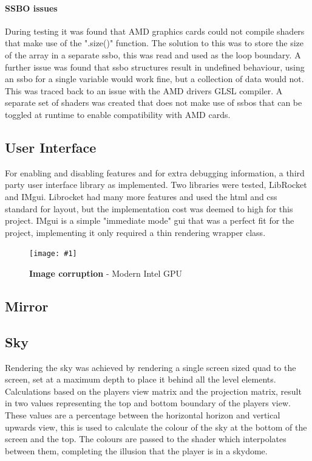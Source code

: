 \documentclass[conference]{acmsiggraph}
\newcommand{\figuremacroW}[4]{
	\begin{figure}[h] %
		\centering
		\texttt{[image: \#1]}
		\caption[#2]{\textbf{#2} - #3}
		\label{fig:#1}
	\end{figure}
}
\begin{document}
\paragraph{SSBO issues}
During testing it was found that AMD graphics cards could not compile shaders that make use of the ".size()" function. The solution to this was to store the size of the array in a separate ssbo, this was read and used as the loop boundary. A further issue was found that ssbo structures result in undefined behaviour, using an ssbo for a single variable would work fine, but a collection of data would not. This was traced back to an issue with the AMD drivers GLSL compiler. A separate set of shaders was created that does not make use of ssbos that can be toggled at runtime to enable compatibility with AMD cards.


\subsection{User Interface}
For enabling and disabling features and for extra debugging information, a third party user interface library as implemented. Two libraries were tested, LibRocket and IMgui. Librocket had many more features and used the html and css standard for layout, but the implementation cost was deemed to high for this project. IMgui is a simple "immediate mode" gui that was a perfect fit for the project, implementing it only required a thin rendering wrapper class.
\figuremacroW
{ui}
{Image corruption}
{Modern Intel GPU}
{1.0}

\subsection{Mirror}
\subsection{Sky}

Rendering the sky was achieved by rendering a single screen sized quad to the screen, set at a maximum depth to place it behind all the level elements. Calculations based on the players view matrix and the projection matrix, result in two values representing the top and bottom boundary of the players view. These values are a percentage between the horizontal horizon and vertical upwards view, this is used to calculate the colour of the sky at the bottom of the screen and the top. The colours are passed to the shader which interpolates between them, completing the illusion that the player is in a skydome.
\end{document}
